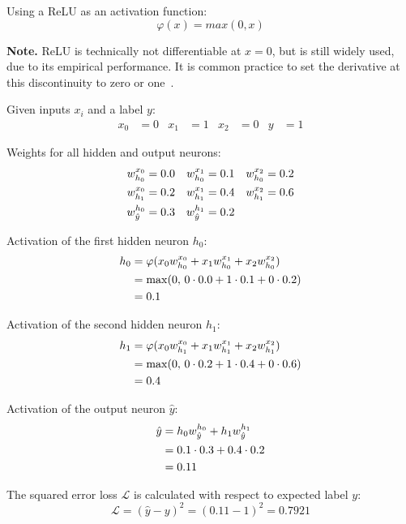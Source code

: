 Using a \ac{ReLU} as an activation function:
\begin{equation}
\varphi(x) = max(0,x)
\end{equation}

\textbf{Note.} \ac{ReLU} is technically not differentiable at $x=0$, but is still widely used, due to its empirical performance. It is common practice to set the derivative at this discontinuity to zero or one~\parencite[p.~4]{Nair:2010}.

Given inputs $x_i$ and a label $y$:
\begin{align}
x_0 &= 0 & x_1 &= 1 & x_2 &= 0 & y &= 1
\end{align}

Weights for all hidden and output neurons:
\begin{align}
w_{h_0}^{x_0} &= 0.0 & w_{h_0}^{x_1} &= 0.1 & w_{h_0}^{x_2} &= 0.2 \\
w_{h_1}^{x_0} &= 0.2 & w_{h_1}^{x_1} &= 0.4 & w_{h_1}^{x_2} &= 0.6 \notag\\
w_{\hat{y}}^{h_0} &= 0.3& w_{\hat{y}}^{h_1} &= 0.2 \notag
\end{align}

Activation of the first hidden neuron $h_0$:
\begin{align}
h_0 &=\varphi(x_0 w_{h_0}^{x_0} + x_1 w_{h_0}^{x_1} + x_2 w_{h_0}^{x_2})\\
&= \max(0,\,0\cdot0.0+1\cdot0.1+0\cdot0.2) \notag\\
&= 0.1 \notag
\end{align}

Activation of the second hidden neuron $h_1$:
\begin{align}
h_1 &= \varphi(x_0 w_{h_1}^{x_0} + x_1 w_{h_1}^{x_1} + x_2 w_{h_1}^{x_2})\\
&= \max(0,\,0\cdot0.2+1\cdot0.4+0\cdot0.6) \notag\\
&= 0.4 \notag
\end{align}

Activation of the output neuron $\hat{y}$:
\begin{align}
\hat{y} &= h_0 w_{\hat{y}}^{h_0} + h_1 w_{\hat{y}}^{h_1} \\
&= 0.1\cdot0.3 + 0.4\cdot0.2 \notag\\
&= 0.11 \notag
\end{align}

The squared error loss $\mathcal{L}$ is calculated with respect to expected label $y$:
\begin{equation}
\mathcal{L} = (\hat{y}-y)^2 = (0.11-1)^2 = 0.7921
\end{equation}

